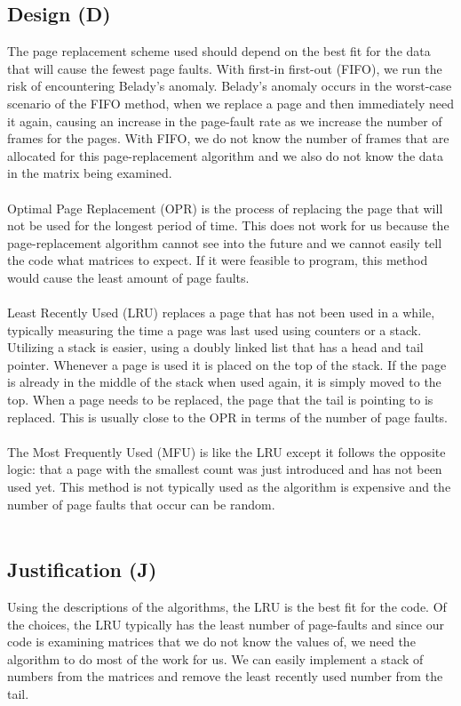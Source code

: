 \documentclass[12pt]{article}
\begin{document}
        \subsection{Design (D)}
        The page replacement scheme used should depend on the best fit for the data that will cause the fewest page faults. 
        With first-in first-out (FIFO), we run the risk of encountering Belady’s anomaly. Belady’s anomaly occurs in the 
        worst-case scenario of the FIFO method, when we replace a page and then immediately need it again, causing an increase 
        in the page-fault rate as we increase the number of frames for the pages. With FIFO, we do not know the number of frames 
        that are allocated for this page-replacement algorithm and we also do not know the data in the matrix being examined.\\
        \\
        Optimal Page Replacement (OPR) is the process of replacing the page that will not be used for the longest period of time. 
        This does not work for us because the page-replacement algorithm cannot see into the future and we cannot easily tell the 
        code what matrices to expect. If it were feasible to program, this method would cause the least amount of page faults.\\
        \\
        Least Recently Used (LRU) replaces a page that has not been used in a while, typically measuring the time a page was last used 
        using counters or a stack. Utilizing a stack is easier, using a doubly linked list that has a head and tail pointer. Whenever a 
        page is used it is placed on the top of the stack. If the page is already in the middle of the stack when used again, it is 
        simply moved to the top. When a page needs to be replaced, the page that the tail is pointing to is replaced. This is 
        usually close to the OPR in terms of the number of page faults.\\
        \\
        The Most Frequently Used (MFU) is like the LRU except it follows the opposite logic: that a page with the smallest 
        count was just introduced and has not been used yet. This method is not typically used as the algorithm is expensive and 
        the number of page faults that occur can be random.\\
        \\
        \subsection{Justification (J)}
        Using the descriptions of the algorithms, the LRU is the best fit for the code. Of the choices, the LRU typically has the 
        least number of page-faults and since our code is examining matrices that we do not know the values of, we need the algorithm 
        to do most of the work for us. We can easily implement a stack of numbers from the matrices and remove the least recently 
        used number from the tail. \\
        \\
\end{document}
